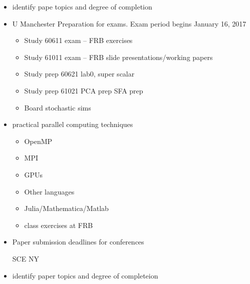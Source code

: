 \documentclass[hyperref]{labbook}
\begin{document}
\begin{description}
  \begin{itemize}
\item identify pape topics and degree of completion
\item U Manchester
  Preparation for exams.  Exam period begins January 16, 2017
  \begin{itemize}
\item Study 60611 exam -- FRB exercises
\item Study 61011 exam -- FRB slide presentations/working papers
\item Study prep 60621 lab0, super scalar 
\item Study prep 61021 PCA prep SFA prep
\item Board stochastic sims
\end{itemize}
\item practical parallel computing techniques
    \begin{itemize}
   \item OpenMP
  \item MPI
  \item GPUs
  \item Other languages
  \item Julia/Mathematica/Matlab
\item class exercises at FRB
  \end{itemize}
\item{Paper submission deadlines for conferences}

\begin{description}
\item[SCE NY] 
\end{description}

\item{identify  paper topics and degree of completeion}



\end{itemize}
\end{description}
\end{document}
